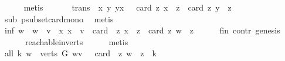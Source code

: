 \begin{isabellebody}
\ \ \ \ \isamarkupfalse%
\ metis\ \isanewline
\ \ \isamarkupfalse%
\ \isamarkupfalse%
\ trans{\isacharcolon}{\kern0pt}\ {\isachardoublequoteopen}{\isasymforall}\ x\ y{\isachardot}{\kern0pt}\ y{\isasymrightarrow}\isactrlsup {\isacharplus}{\kern0pt}x\ {\isasymlongrightarrow}\ \ card\ {\isacharbraceleft}{\kern0pt}z{\isachardot}{\kern0pt}\ x\ {\isasymrightarrow}\isactrlsup {\isacharplus}{\kern0pt}\ z{\isacharbraceright}{\kern0pt}\ {\isacharless}{\kern0pt}\ card\ {\isacharbraceleft}{\kern0pt}z{\isachardot}{\kern0pt}\ y\ {\isasymrightarrow}\isactrlsup {\isacharplus}{\kern0pt}\ z{\isacharbraceright}{\kern0pt}{\isachardoublequoteclose}\isanewline
\ \ \ \ \isamarkupfalse%
\ sub\ psubset{\isacharunderscore}{\kern0pt}card{\isacharunderscore}{\kern0pt}mono\ \isamarkupfalse%
\ metis\isanewline
\ \ \isamarkupfalse%
\ \isamarkupfalse%
\ inf{\isacharcolon}{\kern0pt}\ {\isachardoublequoteopen}{\isasymforall}w{\isachardot}{\kern0pt}\ \ w\ {\isasymrightarrow}\isactrlsup {\isacharplus}{\kern0pt}\ v\ {\isasymlongrightarrow}\ {\isacharparenleft}{\kern0pt}{\isasymexists}x{\isachardot}{\kern0pt}\ x\ {\isasymrightarrow}\isactrlsup {\isacharplus}{\kern0pt}\ v\ {\isasymand}\ card\ \ {\isacharbraceleft}{\kern0pt}z{\isachardot}{\kern0pt}\ x\ {\isasymrightarrow}\isactrlsup {\isacharplus}{\kern0pt}\ z{\isacharbraceright}{\kern0pt}\ {\isachargreater}{\kern0pt}\ card\ {\isacharbraceleft}{\kern0pt}z{\isachardot}{\kern0pt}\ w\ {\isasymrightarrow}\isactrlsup {\isacharplus}{\kern0pt}\ z{\isacharbraceright}{\kern0pt}{\isacharparenright}{\kern0pt}{\isachardoublequoteclose}\isanewline
\ \ \ \ \isamarkupfalse%
\ fin\ contr\ genesis\ \isanewline
\ \ \ \ \ \ reachable{}{\isacharunderscore}{\kern0pt}in{\isacharunderscore}{\kern0pt}verts{\isacharparenleft}{\kern0pt}{}{\isacharparenright}{\kern0pt}\isanewline
\ \ \ \ \isamarkupfalse%
\ metis\ \ \ \ \isanewline
\ \ \isamarkupfalse%
\ all{\isacharcolon}{\kern0pt}\ {\isachardoublequoteopen}{\isasymforall}k{\isachardot}{\kern0pt}\ {\isasymexists}w\ {\isasymin}\ verts\ G{\isachardot}{\kern0pt}\ w{\isasymrightarrow}\isactrlsup {\isacharplus}{\kern0pt}v\ {\isasymand}\ \ card\ \ {\isacharbraceleft}{\kern0pt}z{\isachardot}{\kern0pt}\ w\ {\isasymrightarrow}\isactrlsup {\isacharplus}{\kern0pt}\ z{\isacharbraceright}{\kern0pt}\ {\isachargreater}{\kern0pt}\ k{\isachardoublequoteclose}\ \isanewline
\ \ \isamarkupfalse%
\ \isanewline
\ \ \ \ \isamarkupfalse%

\end{isabellebody}

